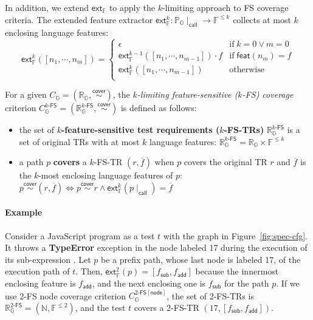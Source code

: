 \documentclass[acmsmall,review,screen]{acmart}
\newcommand{\tif}{\text{if} \; }
\newcommand{\telse}{\text{otherwise}}
\newcommand{\name}[1]{\textsf{#1}}
\newcommand{\jscode}[1]{\text{\lstinline[style=JS]!#1!}}
\newcommand{\graph}{\mathbb{G}}
\newcommand{\nodeset}{\mathbb{N}}
\newcommand{\node}{n}
\newcommand{\patset}[1]{\mathbb{P}_{#1}}
\newcommand{\pat}{p}
\newcommand{\test}{t}
\newcommand{\cover}{\overset{\name{cover}}{\sim}}
\newcommand{\trset}[1]{\mathbb{R}_{#1}}
\newcommand{\tr}{r}
\newcommand{\cov}[1]{C_{#1}}
\newcommand{\featset}{\mathbb{F}}
\newcommand{\feat}{f}
\newcommand{\addfeat}{\feat_{\name{add}}}
\newcommand{\subfeat}{\feat_{\name{sub}}}
\newcommand{\feats}{\overline{\feat}}
\newcommand{\featmap}{\name{feat}}
\newcommand{\extfeat}{\name{ext}_\featset}
\newcommand{\extfeats}[1]{\extfeat^{#1}}
\newcommand{\css}[1]{{#1}\!\mid_{\name{call}}}
\newcommand{\kfcov}[2]{\cov{#2}^{{#1}\name{-FS}}}
\newcommand{\kfnodecov}[2]{\cov{#2}^{{#1}\name{-FS}[\name{node}]}}
\newcommand{\kftrset}[2]{\trset{#2}^{{#1}\name{-FS}}}
\begin{document}
In addition, we extend $\extfeat$ to apply the $k$-limiting approach to FS coverage
criteria. The extended feature extractor $\extfeats{k}: \css{\patset{\graph}}
\rightarrow \featset^{\leq k}$ collects at most $k$ enclosing language features:
%
\begin{equation}\label{equ:extfeats}
  \extfeats{k}([\node_1, \cdots, \node_m]) = \left\{
    \begin{array}{ll}
      \epsilon & \tif k = 0 \vee m = 0\\

      \extfeats{k-1}([\node_1, \cdots, \node_{m-1}]) \cdot \feat & \tif
      \featmap(\node_m) = \feat\\

      \extfeats{k}([\node_1, \cdots, \node_{m-1}]) & \telse\\
    \end{array}
  \right.
\end{equation}


\begin{definition}\label{def:k-fs-cov}
  For a given $\cov{\graph} = (\trset{\graph}, \cover)$, the
  \textit{$k$-limiting feature-sensitive ($k$-FS) coverage} criterion
  $\kfcov{k}{\graph} = (\kftrset{k}{\graph}, \cover)$ is defined as follows:
  \begin{itemize}
    \item the set of \textbf{$k$-feature-sensitive test requirements
      ($k$-FS-TRs)} $\kftrset{k}{\graph}$ is a set of original TRs with at most
      $k$ language features:
$
        \kftrset{k}{\graph} = \trset{\graph} \times \featset^{\leq k}
$
    \item a path $\pat$ \textbf{covers} a $k$-FS-TR $(\tr, \feats)$ when $\pat$
      covers the original TR $\tr$ and $\feats$ is the $k$-most enclosing
      language features of $\pat$:
$
        \pat \cover (\tr, \feats) \iff \pat \cover \tr \wedge
        \extfeats{k}(\css{\pat}) = \feats
$
  \end{itemize}
\end{definition}


\paragraph{\textbf{Example}}
%
Consider a JavaScript program \jscode{[] - (2n + 1)} as a test $\test$ with the
graph in Figure~\ref{fig:spec-cfg}.
%
It throws a \textbf{TypeError} exception in the node labeled 17 during the execution
of its sub-expression \jscode{2n + 1}.
%
Let $\pat$ be a prefix path, whose last node is labeled 17, of the execution path
of $\test$.
%
Then, $\extfeats{2}(\pat) = [\subfeat, \addfeat]$ because the innermost enclosing
feature is $\addfeat$, and the next enclosing one is $\subfeat$ for the
path $\pat$.
%
If we use 2-FS node coverage criterion $\kfnodecov{2}{\graph}$, the set of
2-FS-TRs is $\kftrset{2}{\graph} = (\nodeset, \featset^{\leq 2})$, and the test
$\test$ covers a 2-FS-TR $(17, [\subfeat, \addfeat])$.
\end{document}
